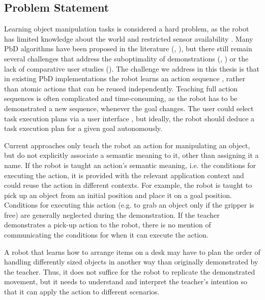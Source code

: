 

\subsection{Problem Statement}
Learning object manipulation tasks is considered a hard problem, as the robot has limited knowledge about the world and restricted sensor availability \cite{ekvall2008robot}.
Many PbD algorithms have been proposed in the literature (\cite{argall2009survey}, \cite{billing2010formalism}), but there still remain several challenges that address the suboptimality of demonstrations (\cite{chen2003programing}, \cite{kaiser1995obtaining}) or the lack of comparative user studies (\cite{suay2012practical}).
The challenge we address in this thesis is that in existing PbD implementations the robot learns an action sequence \cite{EricM.Orendt2016,peppoloni2014ros}, rather than atomic actions that can be reused independently. 
Teaching full action sequences is often complicated and time-consuming, as the robot has to be demonstrated a new sequence, whenever the goal changes.
The user could select task execution plans via a user interface \cite{guerin2015framework}, but ideally, the robot should deduce a task execution plan for a given goal autonomously.

Current approaches only teach the robot an action for manipulating an object, but do not explicitly associate a semantic meaning to it, other than assigning it a name.
If the robot is taught an action's semantic meaning, i.e. the conditions for executing the action, it is provided with the relevant application context and could reuse the action in different contexts.
For example, the robot is taught to pick up an object from an initial position and place it on a goal position.
Conditions for executing this action (e.g. to grab an object only if the gripper is free) are generally neglected during the demonstration.
If the teacher demonstrates a pick-up action to the robot, there is no mention of communicating the conditions for when it can execute the action.

A robot that learns how to arrange items on a desk may have to plan the order of handling differently sized objects in another way than originally demonstrated by the teacher.
Thus, it does not suffice for the robot to replicate the demonstrated movement, but it needs to understand and interpret the teacher's intention so that it can apply the action to different scenarios.

